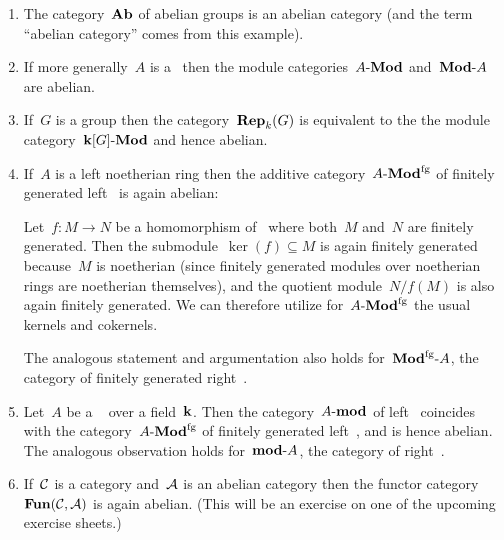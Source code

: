 \begin{example}
  \leavevmode
  \begin{enumerate}
    \item
      The category~$\mathbf{Ab}$ of abelian groups is an abelian category (and the term \enquote{abelian category} comes from this example).
    \item
      If more generally~$A$ is a~{\kalg} then the module categories~$\text{$A$-$\mathbf{Mod}$}$ and~$\text{$\mathbf{Mod}$-$A$}$ are abelian.
    \item
      If~$G$ is a group then the category~$\mathbf{Rep}_{k}(G)$ is equivalent to the the module category~$\text{$\mathbf{k}[G]$-$\mathbf{Mod}$}$ and hence abelian.
    \item
      If~$A$ is a left noetherian ring then the additive category~$\text{$A$-$\mathbf{Mod}^{\mathrm{fg}}$}$ of finitely generated left~{} is again abelian:
      
      Let~$f \colon M \to N$ be a homomorphism of~{} where both~$M$ and~$N$ are finitely generated.
      Then the submodule~$\ker(f) \subseteq M$ is again finitely generated because~$M$ is noetherian (since finitely generated modules over noetherian rings are noetherian themselves), and the quotient module~$N/f(M)$ is also again finitely generated.
      We can therefore utilize for~$\text{$A$-$\mathbf{Mod}^{\mathrm{fg}}$}$ the usual kernels and cokernels.
      
      The analogous statement and argumentation also holds for~$\text{$\mathbf{Mod}^{\mathrm{fg}}$-$A$}$, the category of finitely generated right~{}.
    \item
      Let~$A$ be a {\fd}~{\kalg} over a field~$\mathbf{k}$.
      Then the category~$\text{$A$-$\mathbf{mod}$}$ of {\fd} left~{} coincides with the category~$\text{$A$-$\mathbf{Mod}^{\mathrm{fg}}$}$ of finitely generated left~{}, and is hence abelian.
      The analogous observation holds for~$\text{$\mathbf{mod}$-$A$}$, the category of {\fd} right~{}.
    \item
      If~$\mathcal{C}$ is a category and~$\mathcal{A}$ is an abelian category then the functor category~$\mathbf{Fun}(\mathcal{C}, \mathcal{A})$ is again abelian.
      (This will be an exercise on one of the upcoming exercise sheets.)
  \end{enumerate}
\end{example}


